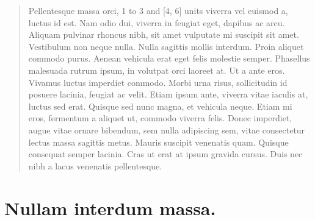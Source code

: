 \begin{quote}
Pellentesque massa orci, 1 to 3 and [4, 6] units viverra vel euismod a, luctus id est. Nam odio dui, viverra in feugiat eget, dapibus ac arcu. Aliquam pulvinar rhoncus nibh, sit amet vulputate mi suscipit sit amet. Vestibulum non neque nulla. Nulla sagittis mollis interdum. Proin aliquet commodo purus. Aenean vehicula erat eget felis molestie semper. Phasellus malesuada rutrum ipsum, in volutpat orci laoreet at. Ut a ante eros. Vivamus luctus imperdiet commodo. Morbi urna risus, sollicitudin id posuere lacinia, feugiat ac velit. Etiam ipsum ante, viverra vitae iaculis at, luctus sed erat. Quisque sed nunc magna, et vehicula neque. Etiam mi eros, fermentum a aliquet ut, commodo viverra felis. Donec imperdiet, augue vitae ornare bibendum, sem nulla adipiscing sem, vitae consectetur lectus massa sagittis metus. Mauris suscipit venenatis quam. Quisque consequat semper lacinia. Cras ut erat at ipsum gravida cursus. Duis nec nibh a lacus venenatis pellentesque.
\end{quote}

\section[Nullam interdum massa]{Nullam interdum massa. \hyperlink{toc}{\hyperback}}

